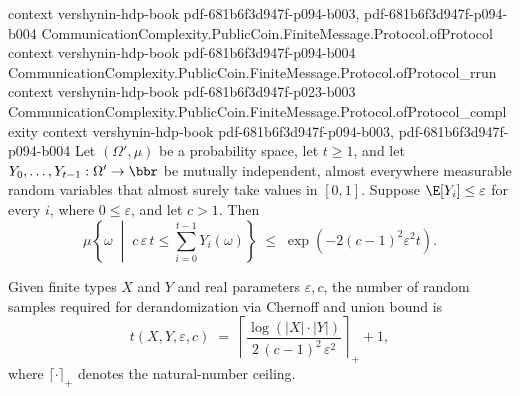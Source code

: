 \begin{theorem}
  {context}
  {vershynin-hdp-book}
  {pdf-681b6f3d947f-p094-b003,
    pdf-681b6f3d947f-p094-b004}
\proofstep
  {CommunicationComplexity.PublicCoin.FiniteMessage.Protocol.ofProtocol}
  {context}
  {vershynin-hdp-book}
  {pdf-681b6f3d947f-p094-b004}
\proofstep
  {CommunicationComplexity.PublicCoin.FiniteMessage.Protocol.ofProtocol_rrun}
  {context}
  {vershynin-hdp-book}
  {pdf-681b6f3d947f-p023-b003}
\proofstep
  {CommunicationComplexity.PublicCoin.FiniteMessage.Protocol.ofProtocol_complexity}
  {context}
  {vershynin-hdp-book}
  {pdf-681b6f3d947f-p094-b003,
    pdf-681b6f3d947f-p094-b004}
\label{CommunicationComplexity.PublicCoin.FiniteMessage.Protocol.prob_many_events_le}
\leanok
{}
Let $(\Omega', \mu)$ be a probability space, let $t \ge 1$, and let $Y_0, \dots, Y_{t-1}
: \Omega' \to \bbr$ be mutually independent, almost everywhere measurable random
variables that almost surely take values in $[0,1]$. Suppose $\E[Y_i] \le \varepsilon$
for every $i$, where $0 \le \varepsilon$, and let $c > 1$. Then
\[
\mu\!\left\{\omega \;\middle|\; c\,\varepsilon\,t \le \sum_{i=0}^{t-1}
Y_i(\omega)\right\}
  \;\le\;
  \exp\!\left(-2(c-1)^2\varepsilon^2 t\right).
\]
\end{theorem}

\begin{definition}
\label{CommunicationComplexity.PublicCoin.FiniteMessage.Protocol.derandomizationSamples}
\leanok
Given finite types $X$ and $Y$ and real parameters $\varepsilon, c$, the number of random
samples required for derandomization via Chernoff and union bound is
\[
  t(X, Y, \varepsilon, c) \;=\;
  \left\lceil
    \frac{\log(|X|\cdot|Y|)}{2\,(c-1)^2\,\varepsilon^2}
  \right\rceil_{\!+} + 1,
\]
where $\lceil\cdot\rceil_{+}$ denotes the natural-number ceiling.
\end{definition}

